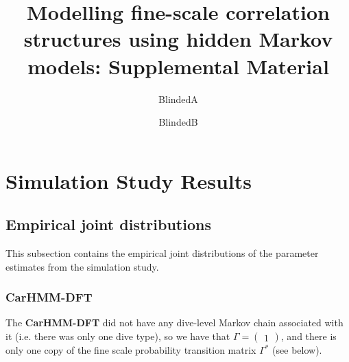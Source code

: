 \documentclass[12pt]{TD-CJS}
\begin{document}

\renewcommand{\eqref}[1]{(\ref{#1})}
\newcommand{\mb}[1]{\mathbf{#1}}
\newcommand{\mbb}[1]{\mathbb{#1}}
\newcommand{\mt}[1]{\mathrm{#1}}
\newcommand{\rv}{random variable}
\newcommand{\newblock}{}


\title[]{Modelling fine-scale correlation structures using hidden Markov models: Supplemental Material}%
\author{BlindedA\thanksref{*}}
\author{BlindedB}


\makechaptertitle

\section{Simulation Study Results}

\subsection{Empirical joint distributions}

This subsection contains the empirical joint distributions of the parameter estimates from the simulation study.

\subsubsection{\textbf{CarHMM-DFT}}

The \textbf{CarHMM-DFT} did not have any dive-level Markov chain associated with it (i.e. there was only one dive type), so we have that $\Gamma = \begin{pmatrix} 1 \end{pmatrix}$, and there is only one copy of the fine scale probability transition matrix $\Gamma^*$ (see below).
\end{document}
